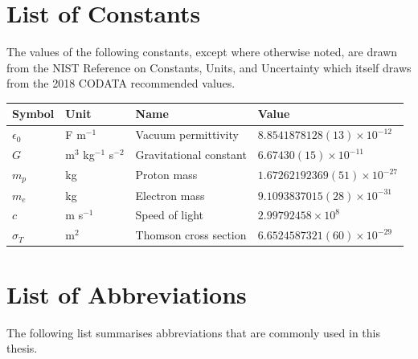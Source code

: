 \documentclass[11pt, a4paper]{book}
\begin{document}
\chapter*{List of Constants}

The values of the following constants, except where otherwise noted, are drawn from the NIST Reference on Constants, Units, and Uncertainty \citep{mohr_nist_2019} which itself draws from the 2018 CODATA recommended values.

\begin{longtable}{llll}
\toprule
\bfseries Symbol & \bfseries Unit & \bfseries Name & \bfseries Value \\\midrule\endhead
$\epsilon_0$ & F m$^{-1}$ & Vacuum permittivity & $8.8541878128(13) \times 10^{-12}$ \\
$G$ & m$^3$ kg$^{-1}$ s$^{-2}$ & Gravitational constant & $6.67430(15) \times 10^{-11}$ \\
$m_p$ & kg & Proton mass & $1.67262192369(51) \times 10^{-27}$ \\
$m_e$ & kg & Electron mass & $9.1093837015(28) \times 10^{-31}$\\
$c$ & m s$^{-1}$ & Speed of light & $2.99792458 \times 10^8$ \\
$\sigma_T$ & m$^2$ & Thomson cross section & $6.6524587321(60) \times 10^{-29}$\\
\bottomrule
\end{longtable}

\chapter*{List of Abbreviations}

The following list summarises abbreviations that are commonly used in this thesis.
\end{document}
